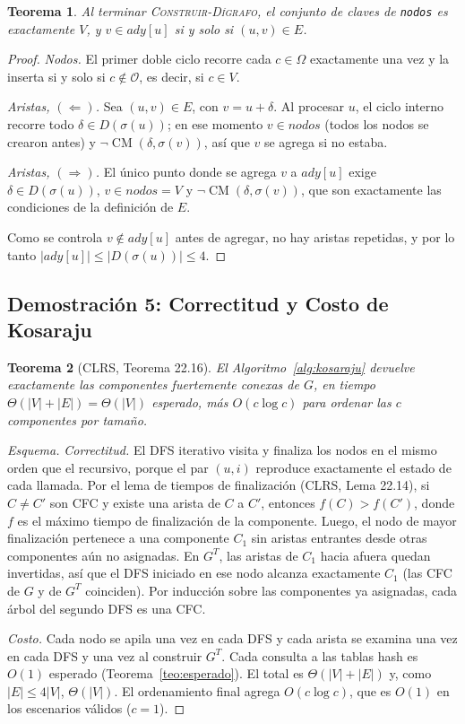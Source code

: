 \documentclass[11pt,a4paper]{article}
\newtheorem{teorema}{Teorema}
\theoremstyle{definition}
\newcommand{\CM}{\operatorname{CM}}
\begin{document}
\begin{teorema}\label{teo:digrafo}
Al terminar \textsc{Construir-Dígrafo}, el conjunto de claves de \texttt{nodos} es exactamente $V$, y $v\in ady[u]$ si y solo si $(u,v)\in E$.
\end{teorema}
\begin{proof}
\emph{Nodos.} El primer doble ciclo recorre cada $c\in\Omega$ exactamente una vez y la inserta si y solo si $c\notin\mathcal{O}$, es decir, si $c\in V$.

\emph{Aristas, $(\Leftarrow)$.} Sea $(u,v)\in E$, con $v=u+\delta$. Al procesar $u$, el ciclo interno recorre todo $\delta\in D(\sigma(u))$; en ese momento $v\in nodos$ (todos los nodos se crearon antes) y $\neg\CM(\delta,\sigma(v))$, así que $v$ se agrega si no estaba.

\emph{Aristas, $(\Rightarrow)$.} El único punto donde se agrega $v$ a $ady[u]$ exige $\delta\in D(\sigma(u))$, $v\in nodos=V$ y $\neg\CM(\delta,\sigma(v))$, que son exactamente las condiciones de la definición de $E$.

Como se controla $v\notin ady[u]$ antes de agregar, no hay aristas repetidas, y por lo tanto $|ady[u]|\le|D(\sigma(u))|\le4$.
\end{proof}

\subsection{Demostración 5: Correctitud y Costo de Kosaraju}

\begin{teorema}[CLRS, Teorema 22.16]
El Algoritmo~\ref{alg:kosaraju} devuelve exactamente las componentes fuertemente conexas de $G$, en tiempo $\Theta(|V|+|E|)=\Theta(|V|)$ esperado, más $O(c\log c)$ para ordenar las $c$ componentes por tamaño.
\end{teorema}
\begin{proof}[Esquema]
\emph{Correctitud.} El DFS iterativo visita y finaliza los nodos en el mismo orden que el recursivo, porque el par $(u,i)$ reproduce exactamente el estado de cada llamada. Por el lema de tiempos de finalización (CLRS, Lema 22.14), si $C\neq C'$ son CFC y existe una arista de $C$ a $C'$, entonces $f(C)>f(C')$, donde $f$ es el máximo tiempo de finalización de la componente. Luego, el nodo de mayor finalización pertenece a una componente $C_1$ sin aristas entrantes desde otras componentes aún no asignadas. En $G^T$, las aristas de $C_1$ hacia afuera quedan invertidas, así que el DFS iniciado en ese nodo alcanza exactamente $C_1$ (las CFC de $G$ y de $G^T$ coinciden). Por inducción sobre las componentes ya asignadas, cada árbol del segundo DFS es una CFC.

\emph{Costo.} Cada nodo se apila una vez en cada DFS y cada arista se examina una vez en cada DFS y una vez al construir $G^T$. Cada consulta a las tablas hash es $O(1)$ esperado (Teorema~\ref{teo:esperado}). El total es $\Theta(|V|+|E|)$ y, como $|E|\le4|V|$, $\Theta(|V|)$. El ordenamiento final agrega $O(c\log c)$, que es $O(1)$ en los escenarios válidos ($c=1$).
\end{proof}
\end{document}
